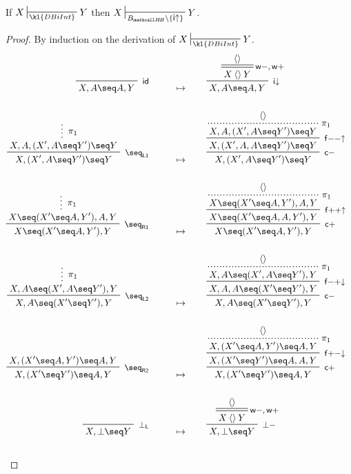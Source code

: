 \begin{lemma}
  
  If $X \prov{\kl{DBiInt}} Y$ then $X \prov{\sysBHB \setminus
  \{\rsf{i{\ua}}\}} Y$.
\end{lemma}
\begin{proof}
  By induction on the derivation of $X \prov{\kl{DBiInt}} Y$. 
  \begin{align*}
    \R[\rsf{id}]
      {}
      {X, A \seq A, Y}
    &\mt
    \R[\rsf{i{\da}}]
    {\prftree[r][d]{\rsf{w{-},w{+}}}
    {\piq{}}
    {X \piq{} Y}}
    {X, A \seq A, Y}
    \\\\
    \R[\rsf{\seq_{L1}}]
      {\summ[$\pi_1$]{X, A, (X', A \seq Y') \seq Y}}
      {X, (X', A \seq Y') \seq Y}
    &\mt
    \R[\rsf{c{-}}]
    {\R[\rsf{f{-}{-}{\ua}}]
    {\prftree[r][dotted]{$\pi_1$}
    {\piq{}}
    {X, A, (X', A \seq Y') \seq Y}}
    {X, (X', A, A \seq Y') \seq Y}}
    {X, (X', A \seq Y') \seq Y}
    \\\\
    \R[\rsf{\seq_{R1}}]
      {\summ[$\pi_1$]{X \seq  (X' \seq A, Y'), A, Y}}
      {X \seq (X' \seq A, Y'), Y}
    &\mt
    \R[\rsf{c{+}}]
    {\R[\rsf{f{+}{+}{\ua}}]
    {\prftree[r][dotted]{$\pi_1$}
    {\piq{}}
    {X \seq (X' \seq A, Y'), A, Y}}
    {X \seq (X' \seq A, A, Y'), Y}}
    {X \seq (X' \seq A, Y'), Y}
    \\\\
    \R[\rsf{\seq_{L2}}]
      {\summ[$\pi_1$]{X, A \seq (X', A \seq Y'), Y}}
      {X, A \seq (X' \seq Y'), Y}
    &\mt
    \R[\rsf{c{-}}]
    {\R[\rsf{f{-}{+}{\da}}]
    {\prftree[r][dotted]{$\pi_1$}
    {\piq{}}
    {X, A \seq (X', A \seq Y'), Y}}
    {X, A, A \seq (X' \seq Y'), Y}}
    {X, A \seq (X' \seq Y'), Y}
    \\\\
    \R[\rsf{\seq_{R2}}]
      {X, (X' \seq A, Y') \seq A, Y}
      {X, (X' \seq Y') \seq A, Y}
    &\mt
    \R[\rsf{c{+}}]
    {\R[\rsf{f{+}{-}{\da}}]
    {\prftree[r][dotted]{$\pi_1$}
    {\piq{}}
    {X, (X' \seq A, Y') \seq A, Y}}
    {X, (X' \seq Y') \seq A, A, Y}}
    {X, (X' \seq Y') \seq A, Y}
    \\\\
    \R[\rsf{\bot_L}]
      {}
      {X, \bot \seq Y}
    &\mt
    \R[\rsf{\bot{-}}]
    {\prftree[r][d]{\rsf{w{-},w{+}}}
    {\piq{}}
    {X \piq{} Y}}
    {X, \bot \seq Y}
    \\\\

\end{align*}
\end{proof}
